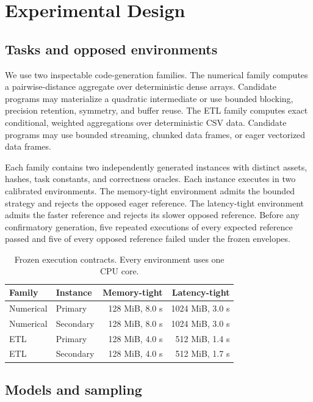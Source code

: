 \documentclass[sigconf,anonymous]{aamas}
\begin{document}
\section{Experimental Design}

\subsection{Tasks and opposed environments}

We use two inspectable code-generation families. The numerical family computes a
pairwise-distance aggregate over deterministic dense arrays. Candidate programs
may materialize a quadratic intermediate or use bounded blocking, precision
retention, symmetry, and buffer reuse. The ETL family computes exact conditional,
weighted aggregations over deterministic CSV data. Candidate programs may use
bounded streaming, chunked data frames, or eager vectorized data frames.

Each family contains two independently generated instances with distinct assets,
hashes, task constants, and correctness oracles. Each instance executes in two
calibrated environments. The memory-tight environment admits the bounded strategy
and rejects the opposed eager reference. The latency-tight environment admits the
faster reference and rejects its slower opposed reference. Before any confirmatory
generation, five repeated executions of every expected reference passed and five
of every opposed reference failed under the frozen envelopes.

\begin{table}[t]
  \caption{Frozen execution contracts. Every environment uses one CPU core.}
  \label{tab:contracts}
  \centering
  \small
  \begin{tabular}{llrr}
    \toprule
    Family & Instance & Memory-tight & Latency-tight \\
    \midrule
    Numerical & Primary & 128 MiB, 8.0 s & 1024 MiB, 3.0 s \\
    Numerical & Secondary & 128 MiB, 8.0 s & 1024 MiB, 3.0 s \\
    ETL & Primary & 128 MiB, 4.0 s & 512 MiB, 1.4 s \\
    ETL & Secondary & 128 MiB, 4.0 s & 512 MiB, 1.7 s \\
    \bottomrule
  \end{tabular}
\end{table}

\subsection{Models and sampling}
\end{document}
